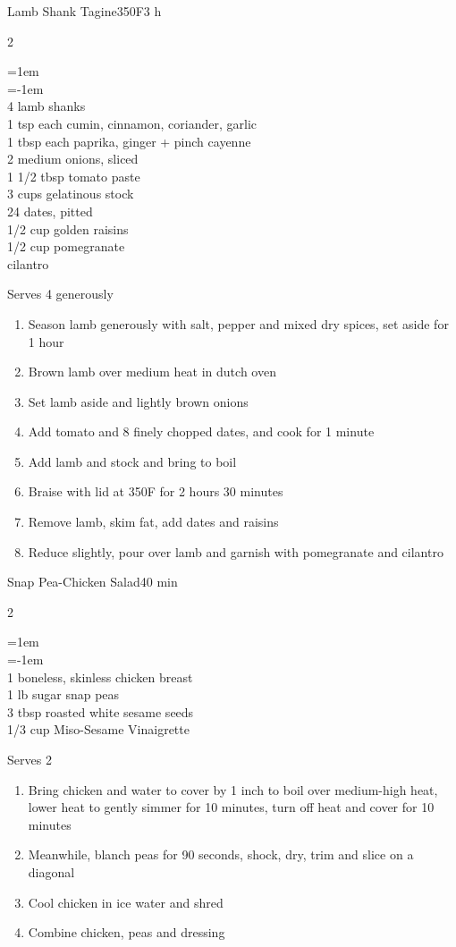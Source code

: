\documentclass{article}
\newenvironment{recipe}[3][]
    {\begin{cardbase}[#1]{#2}{#3}
    \columnratio{0.333}
    \begin{paracol}{2}}
    {\end{paracol}\end{cardbase}}
\newenvironment{denserecipe}[3][]
    {\small
    \begin{recipe}[#1]{#2}{#3}}
    {\end{recipe}}
\newcommand{\nextcolumn}{\switchcolumn}
\newenvironment{ingredients}
    {
    \begin{obeylines}
    \vspace{\parskip}
    \setlength{\parskip}{0.25em}
    \vspace{-0.25em}
    \leftskip=1em
    \parindent=-1em}
    {\end{obeylines}}
\newenvironment{steps}
    {\begin{enumerate}[leftmargin=*,topsep=0pt]}
    {\end{enumerate}}
\newcommand{\fahrenheit}[1]{#1\textdegree{}F}
\newcommand{\tag}[1]{\hspace{1em}#1}
\newcommand{\symboltag}[2]{\tag{#1\hspace{0.4em}#2}}
\newcommand{\totaltime}[1]{\symboltag{\raisebox{-0.1em}{\small\StopWatchEnd}}{#1}}
\newcommand{\preheat}[1]{\symboltag{\Topbottomheat}{#1}}
\begin{document}
\begin{denserecipe}{Lamb Shank Tagine}{\preheat{\fahrenheit{350}}\totaltime{3 h}}
\begin{ingredients}
4 lamb shanks
1 tsp each cumin, cinnamon, coriander, garlic
1 tbsp each paprika, \mbox{ginger} + pinch cayenne
2 medium onions, sliced
1 1/2 tbsp tomato paste
3 cups gelatinous stock
24 dates, pitted
1/2 cup golden raisins
1/2 cup pomegranate
cilantro
\end{ingredients}
\nextcolumn
Serves 4 generously
\begin{steps}
    \item Season lamb generously with salt, pepper and mixed dry spices, set aside for 1 hour
    \item Brown lamb over medium heat in dutch oven
    \item Set lamb aside and lightly brown onions
    \item Add tomato and 8 finely chopped dates, and cook for 1 minute
    \item Add lamb and stock and bring to boil
    \item Braise with lid at \fahrenheit{350} for 2 hours 30 minutes
    \item Remove lamb, skim fat, add dates and raisins
    \item Reduce slightly, pour over lamb and garnish with pomegranate and cilantro
\end{steps}
\end{denserecipe}

\begin{recipe}{Snap Pea-Chicken Salad}{\totaltime{40 min}}
\begin{ingredients}
1 boneless, skinless chicken breast
1 lb sugar snap peas
3 tbsp roasted white sesame seeds
1/3 cup Miso-Sesame Vinaigrette
\end{ingredients}
\nextcolumn
Serves 2
\begin{steps}
    \item Bring chicken and water to cover by 1 inch to boil over medium-high heat, lower heat to gently simmer for 10 minutes, turn off heat and cover for 10 minutes
    \item Meanwhile, blanch peas for 90 seconds, shock, dry, trim and slice on a diagonal
    \item Cool chicken in ice water and shred
    \item Combine chicken, peas and dressing
\end{steps}
\end{recipe}
\end{document}
